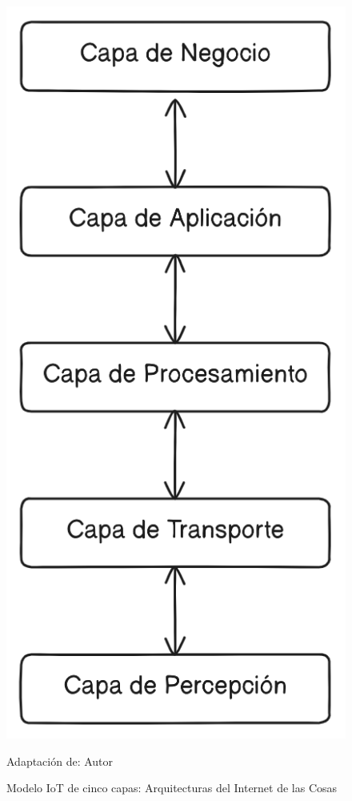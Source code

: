 \documentclass[stu,12pt,floatsintext]{apa7}
\begin{document}
		\begin{figure}[H]
		\centering
		\includegraphics[scale=0.3]{iot_modelo_5_capas}
		\captionsetup{justification=centering}
		\caption{Modelo IoT de cinco capas: Arquitecturas del Internet de las Cosas}
		\small
		\label{iot_cinco_capas}
		Adaptación de: Autor
	\end{figure}
	
\end{document}
